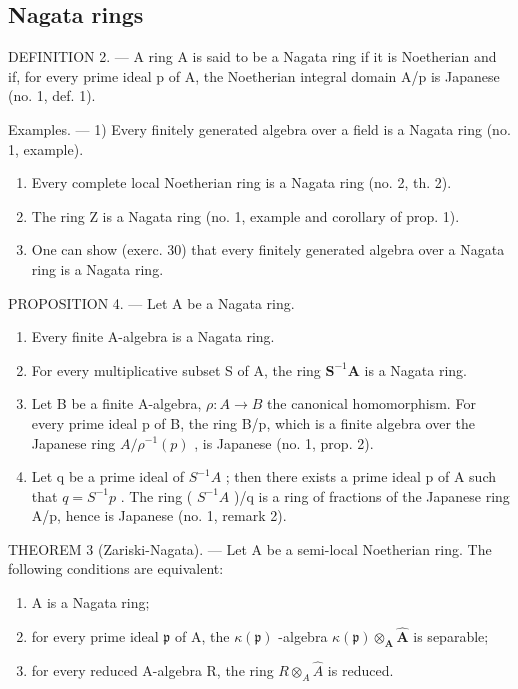 \subsection{Nagata rings}

DEFINITION 2. --- A ring A is said to be a Nagata ring if it is Noetherian and if, for every prime ideal p of A, the Noetherian integral domain A/p is Japanese (no. 1, def. 1).

Examples. --- 1) Every finitely generated algebra over a field is a Nagata ring (no. 1, example).

\begin{enumerate}
\def\labelenumi{\arabic{enumi})}
\setcounter{enumi}{1}
\item
  Every complete local Noetherian ring is a Nagata ring (no. 2, th. 2).
\item
  The ring Z is a Nagata ring (no. 1, example and corollary of prop. 1).
\item
  One can show (exerc. 30) that every finitely generated algebra over a Nagata ring is a Nagata ring.
\end{enumerate}

PROPOSITION 4. --- Let A be a Nagata ring.

\begin{enumerate}
\def\labelenumi{\alph{enumi})}
\item
  Every finite A-algebra is a Nagata ring.
\item
  For every multiplicative subset S of A, the ring \(\mathbf{S}^{-1}\mathbf{A}\) is a Nagata ring.
\item
  Let B be a finite A-algebra, \(\rho: A \to B\) the canonical homomorphism. For every prime ideal p of B, the ring B/p, which is a finite algebra over the Japanese ring \(A/\rho^{-1}(p)\) , is Japanese (no. 1, prop. 2).
\item
  Let q be a prime ideal of \(S^{-1}A\) ; then there exists a prime ideal p of A such that \(q = S^{-1}p\) . The ring ( \(S^{-1}A\) )/q is a ring of fractions of the Japanese ring A/p, hence is Japanese (no. 1, remark 2).
\end{enumerate}

THEOREM 3 (Zariski-Nagata). --- Let A be a semi-local Noetherian ring. The following conditions are equivalent:

\begin{enumerate}
\def\labelenumi{(\roman{enumi})}
\item
  A is a Nagata ring;
\item
  for every prime ideal \(\mathfrak{p}\) of A, the \(\kappa(\mathfrak{p})\) -algebra \(\kappa(\mathfrak{p}) \otimes_{\mathbf{A}} \hat{\mathbf{A}}\) is separable;
\item
  for every reduced A-algebra R, the ring \(R \otimes_{A} \hat{A}\) is reduced.
\end{enumerate}


